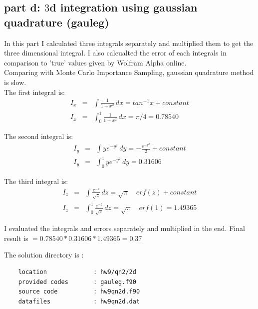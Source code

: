 \documentclass[11pt,a4paper,english]{article}
\begin{document}
\subsection{part d: $3$d integration using gaussian quadrature (gauleg) }
	
    In this part I calculated three integrals separately and multiplied them 
    to get the three dimensional integral.
    I also calcualted the error of each integrals in comparison to 'true'
    values given by Wolfram Alpha online.\\
    Comparing with Monte Carlo Importance Sampling, gaussian quadrature method
    is slow.\\
    The first integral is:\\
    
    \begin{eqnarray}
    I_{x} &=& \int \frac{1}{1 + x^{2}}  \,dx = tan^{-1}x + constant\\
    I_{x} &=& \int_{0}^{1} \!\! \frac{1}{1 + x^{2}}  \,dx = \pi/4 = 0.78540
    \end{eqnarray}
    
    The second integral is:\\
    
    \begin{eqnarray}
    I_{y} &=& \int ye^{-y^{2}}  \,dy = -\frac{e^{-y^{2}}}{2} + constant\\
    I_{y} &=& \int_{0}^{1} \!\! ye^{-y^{2}}  \,dy = 0.31606
    \end{eqnarray}
    
    The third integral is:\\
    
    \begin{eqnarray}
    I_{z} &=& \int \frac{e^{-z}} {\sqrt{z}}  \,dz = \sqrt{\pi} \quad erf(z) + constant\\
    I_{z} &=& \int_{0}^{1} \!\! \frac{e^{-z}} {\sqrt{z}}   \,dz = \sqrt{\pi} \quad erf(1) = 1.49365
    \end{eqnarray}
    
    I evaluated the integrals and errors separately and multiplied in the end.    
    Final result is $= 0.78540 * 0.31606 * 1.49365 = 0.37$
    
    		The solution directory is :\\
	\begin{verbatim}
	location             : hw9/qn2/2d
	provided codes       : gauleg.f90
	source code          : hw9qn2d.f90
	datafiles            : hw9qn2d.dat
	\end{verbatim}
\end{document}
